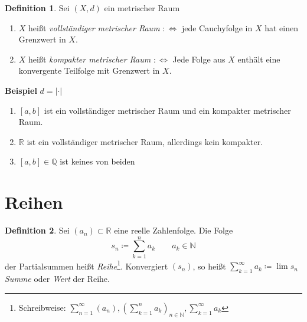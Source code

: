 \documentclass[ngerman,titlepage,twoside, parskip=half*]{scrreprt}
\newcommand*{\N}{\mathbb{N}}
\newcommand*{\Q}{\mathbb{Q}}
\newcommand*{\R}{\mathbb{R}}
\newcommand*{\perdef}{:\Leftrightarrow}
\theoremstyle{plain}
\theoremstyle{definition}
\newtheorem{definition}{Definition}
\theoremstyle{remark}
\begin{document}
\begin{definition}
\label{def:vollst}
Sei $(X,d)$ ein metrischer Raum
\begin{enumerate}[(1)]
  \item $X$ heißt \emph{vollständiger metrischer Raum} $\perdef$ jede Cauchyfolge 
    in $X$ hat einen Grenz\-wert in $X$.
  \item $X$ heißt \emph{kompakter metrischer Raum} $\perdef$ Jede Folge aus $X$ 
    enthält eine konvergente Teilfolge mit Grenzwert in $X$.
\end{enumerate}
\textbf{Beispiel} $d=|\cdot |$
\begin{enumerate}[(1)]
  \item $[a,b]$ ist ein vollständiger metrischer Raum und ein kompakter metrischer Raum.
  \item $\R$ ist ein vollständiger metrischer Raum, allerdings kein kompakter.
  \item $[a,b]\in \Q$ ist keines von beiden
\end{enumerate}
\end{definition}

\section{Reihen}

\begin{definition}
\label{def:reihe}
Sei $(a_n) \subset \R$ eine reelle Zahlenfolge. Die Folge
\[s_n\coloneqq\sum_{k=1}^n a_k \qquad a_k \in \N\] der
Partialsummen heißt
\emph{Reihe}\footnote{Schreibweise: $\sum_{n=1}^\infty
  (a_n), (\sum_{k=1}^n a_k)_{n\in \N}, \sum_{k=1}^\infty a_k$}.
Konvergiert $(s_n)$, so heißt $\sum_{k=1}^\infty a_k\coloneqq\lim s_n$
\emph{Summe} oder \emph{Wert} der
Reihe.
\end{definition}
\end{document}
